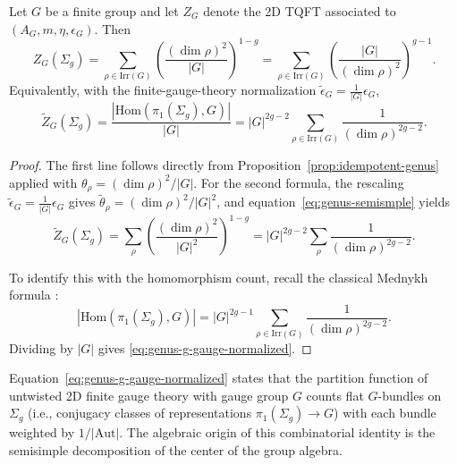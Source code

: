 \begin{theorem}\label{thm:genus-g-finite-group}
Let $G$ be a finite group and let $Z_G$ denote the 2D TQFT associated to $(A_G, m, \eta, \epsilon_G)$. Then
\begin{equation}\label{eq:genus-g-group}
Z_G(\Sigma_g) = \sum_{\rho \in \mathrm{Irr}(G)} \left(\frac{(\dim \rho)^2}{|G|}\right)^{1-g} = \sum_{\rho \in \mathrm{Irr}(G)} \left(\frac{|G|}{(\dim \rho)^2}\right)^{g-1}.
\end{equation}
Equivalently, with the finite-gauge-theory normalization $\widetilde{\epsilon}_G = \frac{1}{|G|}\epsilon_G$,
\begin{equation}\label{eq:genus-g-gauge-normalized}
\widetilde{Z}_G(\Sigma_g) = \frac{|\mathrm{Hom}(\pi_1(\Sigma_g), G)|}{|G|} = |G|^{2g-2} \sum_{\rho \in \mathrm{Irr}(G)} \frac{1}{(\dim \rho)^{2g-2}}.
\end{equation}
\end{theorem}

\begin{proof}
The first line follows directly from Proposition~\ref{prop:idempotent-genus} applied with $\theta_\rho = (\dim\rho)^2/|G|$. For the second formula, the rescaling $\widetilde{\epsilon}_G = \frac{1}{|G|}\epsilon_G$ gives $\widetilde{\theta}_\rho = (\dim\rho)^2/|G|^2$, and equation~\eqref{eq:genus-semismple} yields
\begin{equation}\label{eq:normalized-sum}
\widetilde{Z}_G(\Sigma_g) = \sum_{\rho} \left(\frac{(\dim \rho)^2}{|G|^2}\right)^{1-g} = |G|^{2g-2} \sum_{\rho} \frac{1}{(\dim\rho)^{2g-2}}.
\end{equation}

To identify this with the homomorphism count, recall the classical Mednykh formula \cite{Mednykh1978}:
\begin{equation}\label{eq:mednykh}
|\mathrm{Hom}(\pi_1(\Sigma_g), G)| = |G|^{2g-1} \sum_{\rho \in \mathrm{Irr}(G)} \frac{1}{(\dim \rho)^{2g-2}}.
\end{equation}
Dividing by $|G|$ gives \eqref{eq:genus-g-gauge-normalized}.
\end{proof}

\begin{remark}[Interpretation]\label{rem:mednykh-interpretation}
Equation~\eqref{eq:genus-g-gauge-normalized} states that the partition function of untwisted 2D finite gauge theory with gauge group $G$ counts flat $G$-bundles on $\Sigma_g$ (i.e., conjugacy classes of representations $\pi_1(\Sigma_g) \to G$) with each bundle weighted by $1/|\mathrm{Aut}|$. The algebraic origin of this combinatorial identity is the semisimple decomposition of the center of the group algebra.
\end{remark}

